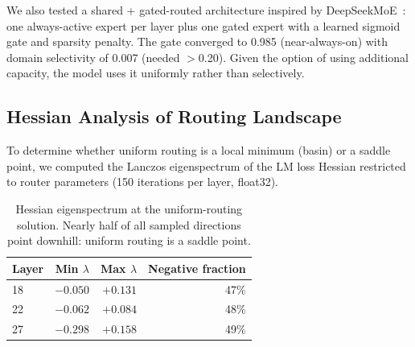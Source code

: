 \documentclass{article}
\begin{document}
We also tested a shared + gated-routed architecture inspired by
DeepSeekMoE~\cite{deepseek2024moe}: one always-active expert per layer plus
one gated expert with a learned sigmoid gate and sparsity penalty. The gate
converged to 0.985 (near-always-on) with domain selectivity of 0.007 (needed
$>$0.20). Given the option of using additional capacity, the model uses it
uniformly rather than selectively.

\subsection{Hessian Analysis of Routing Landscape}
\label{sec:hessian}

To determine whether uniform routing is a local minimum (basin) or a saddle
point, we computed the Lanczos eigenspectrum of the LM loss Hessian restricted
to router parameters (150 iterations per layer, float32).

\begin{table}[h]
\centering
\caption{Hessian eigenspectrum at the uniform-routing solution. Nearly half of
all sampled directions point downhill: uniform routing is a saddle point.}
\label{tab:hessian}
\begin{tabular}{@{}lrrr@{}}
\toprule
Layer & Min $\lambda$ & Max $\lambda$ & Negative fraction \\
\midrule
18 & $-0.050$ & $+0.131$ & 47\% \\
22 & $-0.062$ & $+0.084$ & 48\% \\
27 & $-0.298$ & $+0.158$ & 49\% \\
\bottomrule
\end{tabular}
\end{table}
\end{document}
